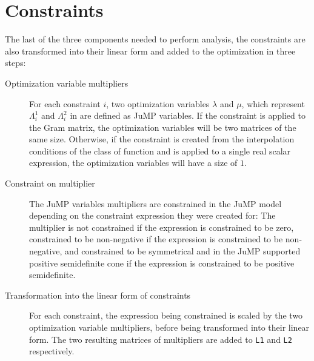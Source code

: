 \section{Constraints}

The last of the three components needed to perform analysis, the constraints are also transformed into their linear form and added to the optimization in three steps:
\begin{description}
\item [Optimization variable multipliers] For each constraint $i$, two optimization variables $\lambda$ and $\mu$, which represent $\Lambda^1_i$ and $\Lambda^2_i$ in  are defined as JuMP variables.
 If the constraint is applied to the Gram matrix, the optimization variables will be two matrices of the same size. Otherwise, if the constraint is created from the interpolation conditions of the class of function and is applied to a single real scalar expression, the optimization variables will have a size of $1$.
\item [Constraint on multiplier] The JuMP variables multipliers are constrained in the JuMP model depending on the constraint expression they were created for: The multiplier is not constrained if the expression is constrained to be zero, constrained to be non-negative if the expression is constrained to be non-negative, and constrained to be symmetrical and in the JuMP supported positive semidefinite cone if the expression is constrained to be positive semidefinite.
\item [Transformation into the linear form of constraints] For each constraint, the expression being constrained is scaled by the two optimization variable multipliers, before being transformed into their linear form. The two resulting matrices of multipliers are added to \texttt{L1} and \texttt{L2} respectively.
\end{description}


